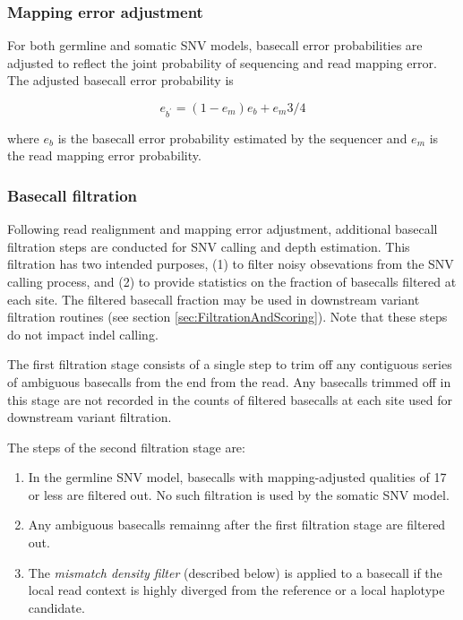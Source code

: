 \documentclass{article}
\begin{document}
\subsubsection{Mapping error adjustment}

For both germline and somatic SNV models, basecall error probabilities are adjusted to reflect the joint probability of sequencing and read mapping error. The adjusted basecall error probability is

\begin{equation*}
e_{b^{\prime}} = (1-e_m)e_b + e_m 3/4
\end{equation*}

where $e_b$ is the basecall error probability estimated by the sequencer and $e_m$ is the read mapping error probability.


\subsubsection{Basecall filtration}
\label{sec:BasecallFiltration}
Following read realignment and mapping error adjustment, additional basecall filtration steps are conducted for SNV calling and depth estimation. This filtration has two intended purposes, (1) to filter noisy obsevations from the SNV calling process, and (2) to provide statistics on the fraction of basecalls filtered at each site. The filtered basecall fraction may be used in downstream variant filtration routines (see section \ref{sec:FiltrationAndScoring}). Note that these steps do not impact indel calling.

The first filtration stage consists of a single step to trim off any contiguous series of ambiguous basecalls from the end from the read. Any basecalls trimmed off in this stage are not recorded in the counts of filtered basecalls at each site used for downstream variant filtration.

The steps of the second filtration stage are:

\begin{enumerate}
    \item In the germline SNV model, basecalls with mapping-adjusted qualities of 17 or less are filtered out. No such filtration is used by the somatic SNV model.
    \item Any ambiguous basecalls remainng after the first filtration stage are filtered out.
    \item The \textit{mismatch density filter} (described below) is applied to a basecall if the local read context is highly diverged from the reference or a local haplotype candidate.
\end{enumerate}
\end{document}
